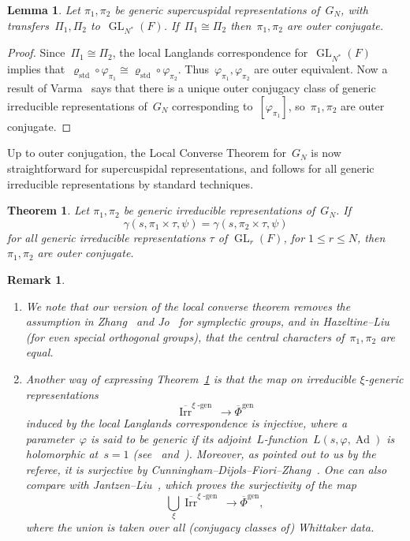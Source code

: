 \documentclass[12pt]{amsart}
\newcommand{\Ad}{\operatorname{Ad}}
\newcommand{\GL}{\operatorname{GL}}
\newcommand{\Irr}{\operatorname{Irr}}
\newcommand{\oIrrchigen}{\overline{\Irr}^{\xi\operatorname{-gen}}}
\newcommand{\oPhigen}{\overline{\Phi}^{\operatorname{gen}}}
\def\rhostd{\varrho_{\mathrm{std}}} %
\newtheorem{thm}{Theorem}[section]
\newtheorem{lem}[thm]{Lemma}
\newtheorem{rmk}[thm]{Remark}
\newtheorem{thm}[equation]{Theorem}
\newtheorem{lem}[equation]{Lemma}
\newtheorem{rmk}[equation]{Remark}
\begin{document}
\begin{lem}\label{lem:conjGNGL}
Let $\pi_1, \pi_2$ be generic supercuspidal representations of~$G_N$, with transfers~$\Pi_1,\Pi_2$ to~$\GL_{N^*}(F)$. If~$\Pi_1\cong\Pi_2$ then~$\pi_1,\pi_2$ are outer conjugate.
\end{lem}

\begin{proof}
Since~$\Pi_1\cong\Pi_2$, the local Langlands correspondence for~$\GL_{N^*}(F)$ implies that~$\rhostd\circ\varphi_{\pi_1}\cong\rhostd\circ\varphi_{\pi_2}$. Thus~$\varphi_{\pi_1},\varphi_{\pi_2}$ are outer equivalent. Now a result of Varma~\cite[Corollary~6.16]{V17}
says that there is a unique outer conjugacy class of generic irreducible representations of~$G_N$ corresponding to~$[\varphi_{\pi_1}]$, so~$\pi_1,\pi_2$ are outer conjugate. 
\end{proof}

Up to outer conjugation, the Local Converse Theorem for~$G_N$ is now straightforward for supercuspidal representations, and follows for all generic irreducible representations by standard techniques.

\begin{thm}\label{uniformproof}
Let $\pi_1, \pi_2$ be generic irreducible representations of~$G_N$.  If 
\[
\gamma(s, \pi_1 \times \tau, \psi) = \gamma(s, \pi_2 \times \tau, \psi)
\]
for all generic irreducible representations $\tau$ of $\GL_r(F)$, for $1\le r\le N$, then~$\pi_1,\pi_2$ are outer conjugate. 
\end{thm}

\begin{rmk} 
\begin{enumerate}
\item We note that our version of the local converse theorem removes the assumption in Zhang~\cite{Z18} and Jo~\cite[Theorem~A]{Jo22} for symplectic groups, and in Hazeltine--Liu~\cite[Theorem~1.2]{HZ23} (for even special orthogonal groups), that the central characters of~$\pi_1,\pi_2$ are equal.
\item Another way of expressing Theorem~\ref{uniformproof} is that the map on irreducible $\xi$-generic representations
\[
\oIrrchigen \to \oPhigen
\]
induced by the local Langlands correspondence is \emph{injective}, where a parameter~$\varphi$ is said to be generic if its adjoint~$L$-function~$L(s,\varphi,\Ad)$ is holomorphic at~$s=1$ (see~\cite[\S2.2]{M24} and~\cite[Proposition~B.1]{GI16}). 
Moreover, as pointed out to us by the referee, it is surjective by Cunningham--Dijols--Fiori--Zhang~\cite[Theorem~0.2(2,3)]{CDFZ25}. One can also compare with Jantzen--Liu~\cite[Theorem~6.20]{JL24}, which proves the surjectivity of the map
\[
\bigcup_{\xi}\oIrrchigen \to \oPhigen,
\]
where the union is taken over all (conjugacy classes of) Whittaker data.
\end{enumerate}
\end{rmk}
\end{document}
